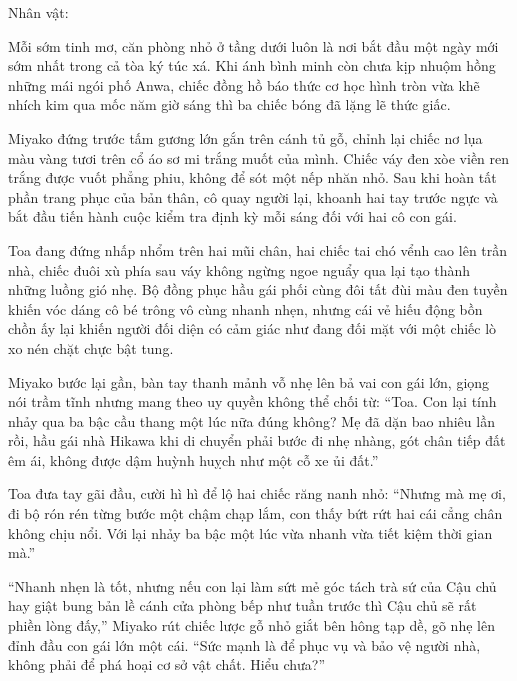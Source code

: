 \documentclass[../main.tex]{subfiles}
\begin{document}
\begin{center}
  {\caviar\fontsize{12pt}{12pt}\selectfont Nhân vật: }
\end{center}


Mỗi sớm tinh mơ, căn phòng nhỏ ở tầng dưới luôn là nơi bắt đầu một ngày mới sớm nhất trong cả tòa ký túc xá. Khi ánh bình minh còn chưa kịp nhuộm hồng những mái ngói phố Anwa, chiếc đồng hồ báo thức cơ học hình tròn vừa khẽ nhích kim qua mốc năm giờ sáng thì ba chiếc bóng đã lặng lẽ thức giấc.

Miyako đứng trước tấm gương lớn gắn trên cánh tủ gỗ, chỉnh lại chiếc nơ lụa màu vàng tươi trên cổ áo sơ mi trắng muốt của mình. Chiếc váy đen xòe viền ren trắng được vuốt phẳng phiu, không để sót một nếp nhăn nhỏ. Sau khi hoàn tất phần trang phục của bản thân, cô quay người lại, khoanh hai tay trước ngực và bắt đầu tiến hành cuộc kiểm tra định kỳ mỗi sáng đối với hai cô con gái.

Toa đang đứng nhấp nhổm trên hai mũi chân, hai chiếc tai chó vểnh cao lên trần nhà, chiếc đuôi xù phía sau váy không ngừng ngoe nguẩy qua lại tạo thành những luồng gió nhẹ. Bộ đồng phục hầu gái phối cùng đôi tất đùi màu đen tuyền khiến vóc dáng cô bé trông vô cùng nhanh nhẹn, nhưng cái vẻ hiếu động bồn chồn ấy lại khiến người đối diện có cảm giác như đang đối mặt với một chiếc lò xo nén chặt chực bật tung.

Miyako bước lại gần, bàn tay thanh mảnh vỗ nhẹ lên bả vai con gái lớn, giọng nói trầm tĩnh nhưng mang theo uy quyền không thể chối từ: ``Toa. Con lại tính nhảy qua ba bậc cầu thang một lúc nữa đúng không? Mẹ đã dặn bao nhiêu lần rồi, hầu gái nhà Hikawa khi di chuyển phải bước đi nhẹ nhàng, gót chân tiếp đất êm ái, không được dậm huỳnh huỵch như một cỗ xe ủi đất.''

Toa đưa tay gãi đầu, cười hì hì để lộ hai chiếc răng nanh nhỏ: ``Nhưng mà mẹ ơi, đi bộ rón rén từng bước một chậm chạp lắm, con thấy bứt rứt hai cái cẳng chân không chịu nổi. Với lại nhảy ba bậc một lúc vừa nhanh vừa tiết kiệm thời gian mà.''

``Nhanh nhẹn là tốt, nhưng nếu con lại làm sứt mẻ góc tách trà sứ của Cậu chủ hay giật bung bản lề cánh cửa phòng bếp như tuần trước thì Cậu chủ sẽ rất phiền lòng đấy,'' Miyako rút chiếc lược gỗ nhỏ giắt bên hông tạp dề, gõ nhẹ lên đỉnh đầu con gái lớn một cái. ``Sức mạnh là để phục vụ và bảo vệ người nhà, không phải để phá hoại cơ sở vật chất. Hiểu chưa?''
\end{document}
